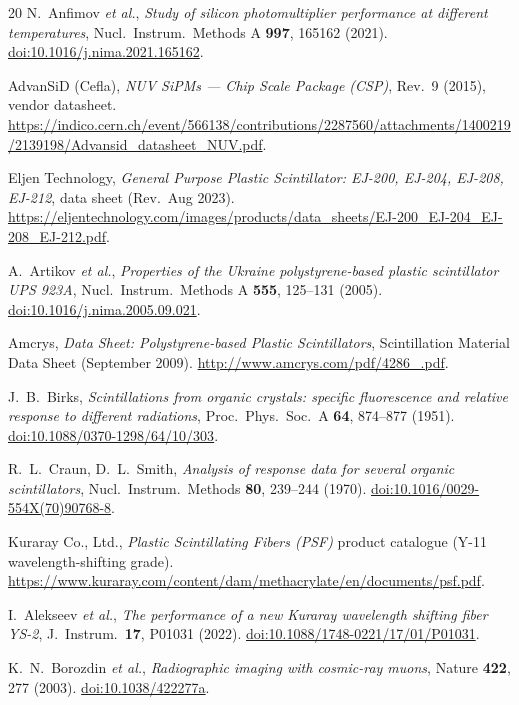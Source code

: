 \documentclass[11pt,a4paper]{article}
\begin{document}
\begin{thebibliography}{20}
N.~Anfimov \emph{et al.},
\emph{Study of silicon photomultiplier performance at different temperatures},
Nucl.\ Instrum.\ Methods A \textbf{997}, 165162 (2021).
\href{https://doi.org/10.1016/j.nima.2021.165162}{doi:10.1016/j.nima.2021.165162}.

AdvanSiD (Cefla),
\emph{NUV SiPMs --- Chip Scale Package (CSP)}, Rev.\ 9 (2015), vendor datasheet.
\url{https://indico.cern.ch/event/566138/contributions/2287560/attachments/1400219/2139198/Advansid_datasheet_NUV.pdf}.

Eljen Technology,
\emph{General Purpose Plastic Scintillator: EJ-200, EJ-204, EJ-208, EJ-212},
data sheet (Rev.\ Aug 2023).
\url{https://eljentechnology.com/images/products/data_sheets/EJ-200_EJ-204_EJ-208_EJ-212.pdf}.

A.~Artikov \emph{et al.},
\emph{Properties of the Ukraine polystyrene-based plastic scintillator UPS 923A},
Nucl.\ Instrum.\ Methods A \textbf{555}, 125--131 (2005).
\href{https://doi.org/10.1016/j.nima.2005.09.021}{doi:10.1016/j.nima.2005.09.021}.

Amcrys,
\emph{Data Sheet: Polystyrene-based Plastic Scintillators},
Scintillation Material Data Sheet (September 2009).
\url{http://www.amcrys.com/pdf/4286_.pdf}.

J.~B.~Birks,
\emph{Scintillations from organic crystals: specific fluorescence and relative
response to different radiations},
Proc.\ Phys.\ Soc.\ A \textbf{64}, 874--877 (1951).
\href{https://doi.org/10.1088/0370-1298/64/10/303}{doi:10.1088/0370-1298/64/10/303}.

R.~L.~Craun, D.~L.~Smith,
\emph{Analysis of response data for several organic scintillators},
Nucl.\ Instrum.\ Methods \textbf{80}, 239--244 (1970).
\href{https://doi.org/10.1016/0029-554X(70)90768-8}{doi:10.1016/0029-554X(70)90768-8}.

Kuraray Co., Ltd.,
\emph{Plastic Scintillating Fibers (PSF)} product catalogue
(Y-11 wavelength-shifting grade).
\url{https://www.kuraray.com/content/dam/methacrylate/en/documents/psf.pdf}.

I.~Alekseev \emph{et al.},
\emph{The performance of a new Kuraray wavelength shifting fiber YS-2},
J.\ Instrum.\ \textbf{17}, P01031 (2022).
\href{https://doi.org/10.1088/1748-0221/17/01/P01031}{doi:10.1088/1748-0221/17/01/P01031}.

K.~N.~Borozdin \emph{et al.},
\emph{Radiographic imaging with cosmic-ray muons},
Nature \textbf{422}, 277 (2003).
\href{https://doi.org/10.1038/422277a}{doi:10.1038/422277a}.


\end{thebibliography}
\end{document}
